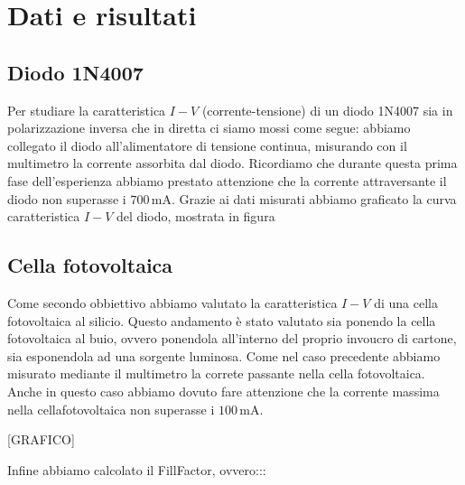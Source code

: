 \section*{Dati e risultati}

\subsection*{Diodo 1N4007}

Per studiare la caratteristica $I-V$ (corrente-tensione) di un diodo 1N4007 sia in polarizzazione inversa che in diretta ci siamo mossi come segue: abbiamo collegato il diodo all'alimentatore di tensione continua, misurando con il multimetro la corrente assorbita dal diodo.
Ricordiamo che durante questa prima fase dell'esperienza abbiamo prestato attenzione che la corrente attraversante il diodo non superasse i $700\,\si{\milli\ampere}$. Grazie ai dati misurati abbiamo graficato la curva caratteristica $I-V$ del diodo, mostrata in figura %

\subsection*{Cella fotovoltaica}

Come secondo obbiettivo abbiamo valutato la caratteristica $I-V$ di una cella fotovoltaica al silicio. Questo andamento è stato valutato sia ponendo la cella fotovoltaica al buio, ovvero ponendola all'interno del proprio invoucro di cartone, sia esponendola ad una sorgente luminosa.
Come nel caso precedente abbiamo misurato mediante il multimetro la correte passante nella cella fotovoltaica.
Anche in questo caso abbiamo dovuto fare attenzione che la corrente massima nella cellafotovoltaica non superasse i $100\,\si{\milli\ampere}$.

[GRAFICO]

Infine abbiamo calcolato il FillFactor, ovvero:::
